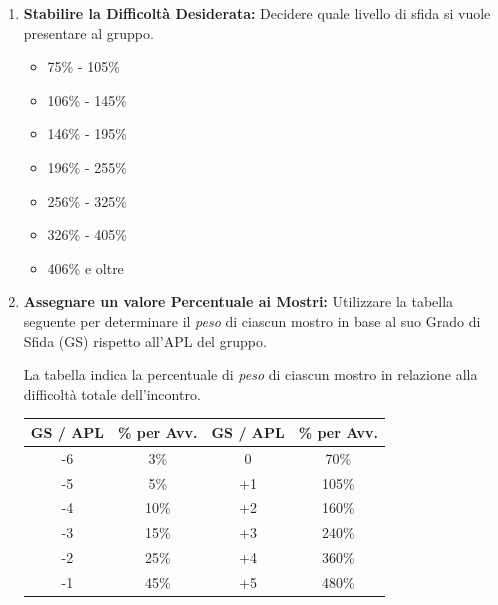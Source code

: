 \documentclass[a4paper,twoside,openany]{book}
\begin{document}
\begin{multicols}{2}
\begin{enumerate}[leftmargin=*]

	\item \textbf{Stabilire la Difficoltà Desiderata:} Decidere quale livello di sfida si vuole presentare al gruppo.





\begin{itemize}[leftmargin=*] \setlength{\itemsep}{0pt}
	\item {} 75\% - 105\%
	\item {} 106\% - 145\%
	\item {} 146\% - 195\%
	\item {} 196\% - 255\%
	\item {} 256\% - 325\%
	\item {} 326\% - 405\%
	\item {} 406\% e oltre
\end{itemize}





	\item \textbf{Assegnare un valore Percentuale ai Mostri:} Utilizzare la tabella seguente per determinare il \emph{peso} di ciascun mostro in base al suo Grado di Sfida (GS) rispetto all'APL del gruppo.

	La tabella indica la percentuale di \emph{peso} di ciascun mostro in relazione alla difficoltà totale dell'incontro.

	\noindent\begin{tabular}{c|c|c|c}
		\textbf{GS / APL} & \textbf{\% per Avv.} &\textbf{GS / APL} & \textbf{\% per Avv.}\\
		\toprule
		-6 & 3\% &  0 & 70\% \\
		-5 & 5\% & +1 & 105\% \\
		-4 & 10\% & +2 & 160\% \\
		-3 & 15\% & +3 & 240\% \\
		-2 & 25\% & +4 & 360\% \\
		-1 & 45\% & +5 & 480\% \\
	\end{tabular}



\end{enumerate}
\end{multicols}
\end{document}
